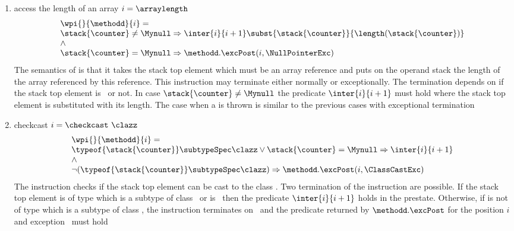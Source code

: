 \begin{itemize}
\begin{enumerate}
					\item access the length of an array $i = \arraylength$
					$$\begin{array}{l}
					        \wpi{ } {\methodd}{i}  =  \\
					 				\stack{\counter } \ne \Mynull \Rightarrow
									 \inter{i}{i+1}
									 \subst{ \stack{\counter } }{ \length(\stack{\counter } )  } \\
									 \wedge \\
								\stack{\counter } = \Mynull \Rightarrow  \methodd.\excPost( i, \NullPointerExc) \\
					  \end{array} $$
					  The semantics of \arraylength is that it takes the stack top element which must be an array reference
					  and puts on the operand stack the length of the array referenced by this reference. This instruction
					  may terminate either normally or exceptionally. The termination depends on if the stack top element is 
					  \Mynull \ or not. In case $\stack{\counter} \neq \Mynull$ the predicate  $\inter{i}{i+1}$ must hold where
					  the stack top element is substituted with its length. The case when a \NullPointerExc is thrown is similar
					  to the previous cases with exceptional termination
					  
					  
					\item checkcast $ i = \checkcast  \ \clazz$
						$$ \begin{array}{l} 
						\wpi{ } {\methodd}{i}  = \\
							\typeof{\stack{\counter}}  \subtypeSpec  \clazz \vee  \stack{\counter} = \Mynull \Rightarrow 
							        \inter{i}{i+1}\\
							
							 \wedge \\
							
							\neg(  \typeof{\stack{\counter}} \subtypeSpec  \clazz  ) \Rightarrow  
							 \methodd.\excPost( i, \ClassCastExc) \\
						\end{array}$$  
					  The instruction checks if the stack top element can be cast to the class \clazz. 
					  Two termination of the instruction  are possible. If the stack top element \stack{\counter} is of type 
					  which is a subtype of class \clazz \  or is \Mynull \ then the predicate $ \inter{i}{i+1} $ holds in the prestate.
					  Otherwise, if   \stack{\counter} is not of type which is a subtype of class \clazz, the instruction terminates
					  on \ClassCastExc \ and the predicate returned by $\methodd.\excPost$ for the position $i$ and exception \ClassCastExc  \
					  must hold 
					  

\end{enumerate}
\end{itemize}
